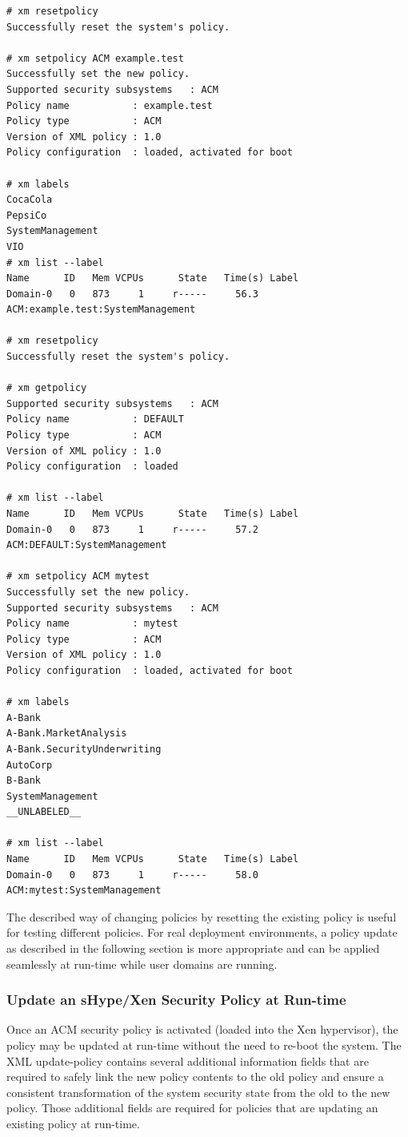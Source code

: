 \documentclass[11pt,twoside,final,openright]{report}
\begin{document}
\begin{scriptsize}
\begin{verbatim}
# xm resetpolicy
Successfully reset the system's policy.

# xm setpolicy ACM example.test
Successfully set the new policy.
Supported security subsystems   : ACM
Policy name           : example.test
Policy type           : ACM
Version of XML policy : 1.0
Policy configuration  : loaded, activated for boot

# xm labels
CocaCola
PepsiCo
SystemManagement
VIO
# xm list --label
Name      ID   Mem VCPUs      State   Time(s) Label
Domain-0   0   873     1     r-----     56.3  ACM:example.test:SystemManagement

# xm resetpolicy
Successfully reset the system's policy.

# xm getpolicy
Supported security subsystems   : ACM
Policy name           : DEFAULT
Policy type           : ACM
Version of XML policy : 1.0
Policy configuration  : loaded

# xm list --label
Name      ID   Mem VCPUs      State   Time(s) Label
Domain-0   0   873     1     r-----     57.2  ACM:DEFAULT:SystemManagement

# xm setpolicy ACM mytest
Successfully set the new policy.
Supported security subsystems   : ACM
Policy name           : mytest
Policy type           : ACM
Version of XML policy : 1.0
Policy configuration  : loaded, activated for boot

# xm labels
A-Bank
A-Bank.MarketAnalysis
A-Bank.SecurityUnderwriting
AutoCorp
B-Bank
SystemManagement
__UNLABELED__

# xm list --label
Name      ID   Mem VCPUs      State   Time(s) Label
Domain-0   0   873     1     r-----     58.0  ACM:mytest:SystemManagement
\end{verbatim}
\end{scriptsize}

The described way of changing policies by resetting the existing
policy is useful for testing different policies. For real deployment
environments, a policy update as described in the following section
is more appropriate and can be applied seamlessly at run-time while
user domains are running.

\subsubsection{Update an sHype/Xen Security Policy at Run-time}

Once an ACM security policy is activated (loaded into the Xen
hypervisor), the policy may be updated at run-time without the
need to re-boot the system. The XML update-policy contains several
additional information fields that are required to safely link the
new policy contents to the old policy and ensure a consistent
transformation of the system security state from the old to the
new policy. Those additional fields are required for policies that
are updating an existing policy at run-time.
\end{document}
